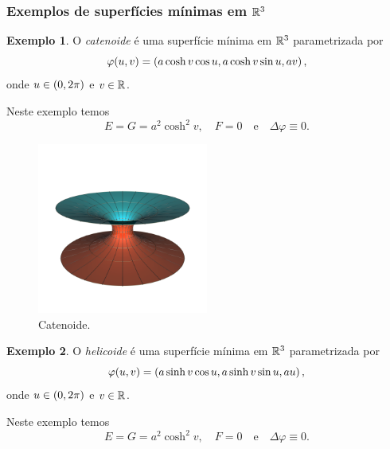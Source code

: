 \documentclass[12pt,a4paper]{beamer}
\theoremstyle{definition}
\newtheorem{exemplo}{Exemplo}
\begin{document}
\begin{frame}[allowframebreaks]
	\frametitle{Exemplos de superfícies mínimas em $\mathbb R^3$}
	
	\begin{exemplo}
		O \emph{catenoide} é uma superfície mínima em $\mathbb R^3$ parametrizada por
		\begin{equation*}
		\varphi(u,v) = \left( a \cosh v \cos u, a \cosh v \sin u, a v \right),
		\end{equation*}
		onde  $u \in \left( 0, 2\pi \right)$ e $v \in \mathbb R$.
	\end{exemplo}
	
	Neste exemplo temos
	\begin{equation*}
	E = G = a^2 \cosh^2 v, \quad F = 0 \quad \text{e} \quad \Delta \varphi \equiv 0.
	\end{equation*}
	
	
	\begin{figure}
		\centering
		\includegraphics[width=0.5\textwidth]{images/catenoid}
		\caption{Catenoide.}
	\end{figure}

		\begin{exemplo}
		O \emph{helicoide} é uma superfície mínima em $\mathbb R^3$ parametrizada por
		\begin{equation*}
		\varphi(u,v) = \left( a \sinh v \cos u, a \sinh v \sin u, au \right),
		\end{equation*}
		onde $u \in \left( 0, 2\pi \right)$ e $v \in \mathbb R$.
	\end{exemplo}
	Neste exemplo temos
	\begin{equation*}
	E = G = a^2 \cosh^2 v, \quad F = 0 \quad \text{e} \quad \Delta \varphi \equiv 0.
	\end{equation*}
	

\end{frame}
\end{document}
